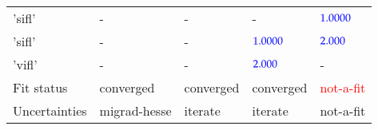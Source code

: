 \documentclass[11pt]{report}
\begin{document}
\begin{table}
\begin{center}
{\begin{tabular}{lp{3.49cm}p{3.49cm}p{3.49cm}p{3.49cm}}
  'sifl' & - & - & - & $\textcolor{blue}{ 1.0000 }$  \\ 
  'sifl' & - & - & $\textcolor{blue}{ 1.0000 }$& $\textcolor{blue}{ 2.000 }$  \\ 
  'vifl' & - & - & $\textcolor{blue}{ 2.000 }$& -   \\ 
      \midrule
  \rowcolor{white}
 Fit status   & converged & converged & converged & \textcolor{red}{ not-a-fit }  \\ 
  \rowcolor{white}
 Uncertainties   & migrad-hesse & iterate & iterate & not-a-fit  \\ 
      \bottomrule
    \end{tabular}
  }
  \end{center}
\end{table}
\end{document}
